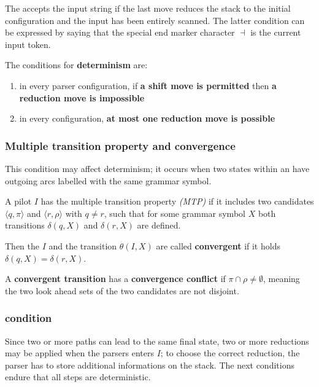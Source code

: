 \documentclass[english]{article}
\begin{document}
The \PDA accepts the input string if the last move reduces the stack to the initial configuration and the input has been entirely scanned.
The latter condition can be expressed by saying that the special end marker character \(\dashv\) is the current input token.

\bigskip
The conditions for \textbf{determinism} are:

\begin{enumerate}
  \item in every parser configuration, if \textbf{a shift move is permitted} then \textbf{a reduction move is impossible}
  \item in every configuration, \textbf{at most one reduction move is possible}
\end{enumerate}

\subsubsection{Multiple transition property and convergence}

This condition may affect determinism;
it occurs when two states within an \mstate have outgoing arcs labelled with the same grammar symbol.

\bigskip
A pilot \mstate \(I\) has the multiple transition property \textit{(MTP)} if it includes two candidates \(\langle q, \pi \rangle\) and \(\langle r, \rho\rangle\) with \(q \neq r\), such that for some grammar symbol \(X\) both transitions \(\delta(q, X)\) and \(\delta(r, X)\) are defined.

Then the \mstate \(I\) and the transition \(\theta(I, X)\) are called \textbf{convergent} if it holds \(\delta(q, X) = \delta(r, X)\).

A \textbf{convergent transition} has a \textbf{convergence conflict} if \(\pi \cap \rho \neq \emptyset\), meaning the two look ahead sets of the two candidates are not disjoint.

\subsubsection[ELR(1) condition]{\ELRo condition}
\label{sec:elro-condition}

Since two or more paths can lead to the same final state, two or more reductions may be applied when the parsers enters \mstate \(I\);
to choose the correct reduction, the parser has to store additional informations on the stack.
The next conditions endure that all steps are deterministic.
\end{document}
